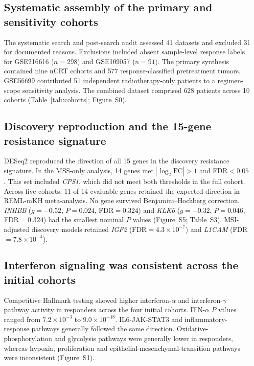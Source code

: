 \documentclass[11pt,a4paper]{article}
\begin{document}
\subsection{Systematic assembly of the primary and sensitivity cohorts}

The systematic search and post-search audit assessed 41 datasets and excluded 31 for documented reasons. Exclusions included absent sample-level response labels for GSE216616 ($n=298$) and GSE109057 ($n=91$). The primary synthesis contained nine nCRT cohorts and 577 response-classified pretreatment tumors. GSE56699 contributed 51 independent radiotherapy-only patients to a regimen-scope sensitivity analysis. The combined dataset comprised 628 patients across 10 cohorts (Table~\ref{tab:cohorts}; Figure~S0).

\subsection{Discovery reproduction and the 15-gene resistance signature}

DESeq2 reproduced the direction of all 15 genes in the discovery resistance signature. In the MSS-only analysis, 14 genes met $|\log_2\mathrm{FC}|>1$ and FDR$<0.05$. This set included \textit{CPS1}, which did not meet both thresholds in the full cohort. Across five cohorts, 11 of 14 evaluable genes retained the expected direction in REML-mKH meta-analysis. No gene survived Benjamini--Hochberg correction. \textit{INHBB} ($g=-0.52$, $P=0.024$, FDR$=0.324$) and \textit{KLK6} ($g=-0.32$, $P=0.046$, FDR$=0.324$) had the smallest nominal $P$ values (Figure~S5; Table~S3). MSI-adjusted discovery models retained \textit{IGF2} (FDR$=4.3\times10^{-7}$) and \textit{L1CAM} (FDR$=7.8\times10^{-4}$).

\subsection{Interferon signaling was consistent across the initial cohorts}

Competitive Hallmark testing showed higher interferon-$\alpha$ and interferon-$\gamma$ pathway activity in responders across the four initial cohorts. IFN-$\alpha$ $P$ values ranged from $7.2\times10^{-3}$ to $9.0\times10^{-18}$. IL6-JAK-STAT3 and inflammatory-response pathways generally followed the same direction. Oxidative-phosphorylation and glycolysis pathways were generally lower in responders, whereas hypoxia, proliferation and epithelial-mesenchymal-transition pathways were inconsistent (Figure~S1).
\end{document}
